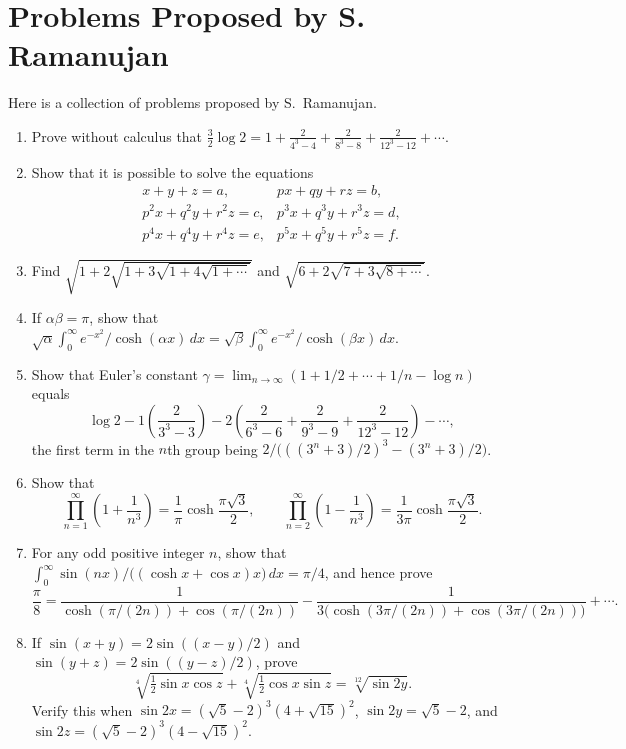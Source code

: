 \documentclass[11pt,a4paper]{article}
\begin{document}
\section*{Problems Proposed by S. Ramanujan}
Here is a collection of problems proposed by S.~Ramanujan.
\begin{enumerate}[label=\arabic*.]
\setcounter{enumi}{0}\item Prove without calculus that
$\frac32\log2=1+\frac2{4^3-4}+\frac2{8^3-8}+\frac2{12^3-12}+\cdots$.
\setcounter{enumi}{1}\item Show that it is possible to solve the equations
\[
\begin{array}{ll}
x+y+z=a,&px+qy+rz=b,\\
p^2x+q^2y+r^2z=c,&p^3x+q^3y+r^3z=d,\\
p^4x+q^4y+r^4z=e,&p^5x+q^5y+r^5z=f.
\end{array}
\]
\setcounter{enumi}{2}\item Find $\sqrt{1+2\sqrt{1+3\sqrt{1+4\sqrt{1+\cdots}}}}$ and
$\sqrt{6+2\sqrt{7+3\sqrt{8+\cdots}}}$.
\setcounter{enumi}{3}\item If $\alpha\beta=\pi$, show that
$\sqrt\alpha\int_0^\infty e^{-x^2}/\cosh(\alpha x)\,dx
=\sqrt\beta\int_0^\infty e^{-x^2}/\cosh(\beta x)\,dx$.
\setcounter{enumi}{4}\item Show that Euler's constant
$\gamma=\lim_{n\to\infty}(1+1/2+\cdots+1/n-\log n)$ equals
\[
\log2-1\left(\frac2{3^3-3}\right)
-2\left(\frac2{6^3-6}+\frac2{9^3-9}+\frac2{12^3-12}\right)-\cdots,
\]
the first term in the $n$th group being
$2/\bigl(((3^n+3)/2)^3-(3^n+3)/2\bigr)$.
\setcounter{enumi}{5}\item Show that
\[
\prod_{n=1}^\infty\left(1+\frac1{n^3}\right)=\frac1\pi\cosh\frac{\pi\sqrt3}{2},
\qquad
\prod_{n=2}^\infty\left(1-\frac1{n^3}\right)=\frac1{3\pi}\cosh\frac{\pi\sqrt3}{2}.
\]
\setcounter{enumi}{6}\item For any odd positive integer $n$, show that
$\int_0^\infty\sin(nx)/\bigl((\cosh x+\cos x)x\bigr)\,dx=\pi/4$, and hence prove
\[
\frac\pi8=\frac1{\cosh(\pi/(2n))+\cos(\pi/(2n))}
-\frac1{3\bigl(\cosh(3\pi/(2n))+\cos(3\pi/(2n))\bigr)}+\cdots.
\]
\setcounter{enumi}{7}\item If $\sin(x+y)=2\sin((x-y)/2)$ and $\sin(y+z)=2\sin((y-z)/2)$, prove
\[
\sqrt[4]{\tfrac12\sin x\cos z}+\sqrt[4]{\tfrac12\cos x\sin z}
=\sqrt[12]{\sin2y}.
\]
Verify this when $\sin2x=(\sqrt5-2)^3(4+\sqrt{15})^2$,
$\sin2y=\sqrt5-2$, and $\sin2z=(\sqrt5-2)^3(4-\sqrt{15})^2$.

\end{enumerate}
\end{document}
